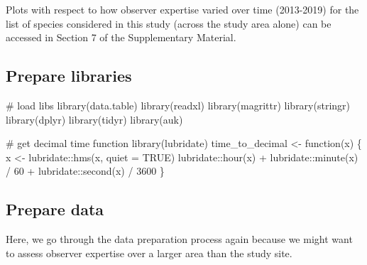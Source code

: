 \documentclass[]{article}
\newenvironment{Shaded}{}{}
\newcommand{\CommentTok}[1]{\textcolor[rgb]{0.00,0.50,0.00}{#1}}
\newcommand{\ControlFlowTok}[1]{\textcolor[rgb]{0.00,0.00,1.00}{#1}}
\newcommand{\DataTypeTok}[1]{#1}
\newcommand{\DecValTok}[1]{#1}
\newcommand{\KeywordTok}[1]{\textcolor[rgb]{0.00,0.00,1.00}{#1}}
\newcommand{\NormalTok}[1]{#1}
\newcommand{\OperatorTok}[1]{#1}
\newcommand{\OtherTok}[1]{\textcolor[rgb]{1.00,0.25,0.00}{#1}}
\newcommand{\StringTok}[1]{\textcolor[rgb]{0.00,0.50,0.50}{#1}}
\begin{document}
Plots with respect to how observer expertise varied over time (2013-2019) for the list of species considered in this study (across the study area alone) can be accessed in Section 7 of the Supplementary Material.

\hypertarget{prepare-libraries-1}{%
\subsection{Prepare libraries}\label{prepare-libraries-1}}

\begin{Shaded}
\begin{Highlighting}[numbers=left,,]

\CommentTok{# load libs}
\KeywordTok{library}\NormalTok{(data.table)}
\KeywordTok{library}\NormalTok{(readxl)}
\KeywordTok{library}\NormalTok{(magrittr)}
\KeywordTok{library}\NormalTok{(stringr)}
\KeywordTok{library}\NormalTok{(dplyr)}
\KeywordTok{library}\NormalTok{(tidyr)}
\KeywordTok{library}\NormalTok{(auk)}

\CommentTok{# get decimal time function}
\KeywordTok{library}\NormalTok{(lubridate)}
\NormalTok{time_to_decimal <-}\StringTok{ }\ControlFlowTok{function}\NormalTok{(x) \{}
\NormalTok{  x <-}\StringTok{ }\NormalTok{lubridate}\OperatorTok{::}\KeywordTok{hms}\NormalTok{(x, }\DataTypeTok{quiet =} \OtherTok{TRUE}\NormalTok{)}
\NormalTok{  lubridate}\OperatorTok{::}\KeywordTok{hour}\NormalTok{(x) }\OperatorTok{+}\StringTok{ }\NormalTok{lubridate}\OperatorTok{::}\KeywordTok{minute}\NormalTok{(x) }\OperatorTok{/}\StringTok{ }\DecValTok{60} \OperatorTok{+}\StringTok{ }\NormalTok{lubridate}\OperatorTok{::}\KeywordTok{second}\NormalTok{(x) }\OperatorTok{/}\StringTok{ }\DecValTok{3600}
\NormalTok{\}}
\end{Highlighting}
\end{Shaded}

\hypertarget{prepare-data}{%
\subsection{Prepare data}\label{prepare-data}}

Here, we go through the data preparation process again because we might want to assess observer expertise over a larger area than the study site.
\end{document}
